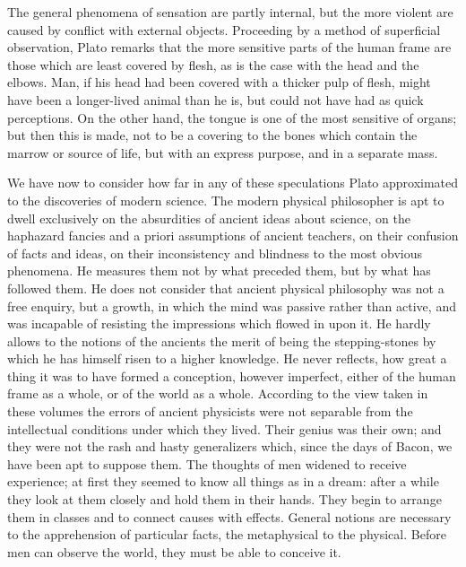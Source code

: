 The general phenomena of sensation are partly internal, but the more
violent are caused by conflict with external objects. Proceeding by a
method of superficial observation, Plato remarks that the more sensitive
parts of the human frame are those which are least covered by flesh, as is
the case with the head and the elbows. Man, if his head had been covered
with a thicker pulp of flesh, might have been a longer-lived animal than
he is, but could not have had as quick perceptions. On the other hand, the
tongue is one of the most sensitive of organs; but then this is made, not
to be a covering to the bones which contain the marrow or source of life,
but with an express purpose, and in a separate mass.


We have now to consider how far in any of these speculations Plato
approximated to the discoveries of modern science. The modern physical
philosopher is apt to dwell exclusively on the absurdities of ancient
ideas about science, on the haphazard fancies and a priori assumptions of
ancient teachers, on their confusion of facts and ideas, on their
inconsistency and blindness to the most obvious phenomena. He measures
them not by what preceded them, but by what has followed them. He does not
consider that ancient physical philosophy was not a free enquiry, but a
growth, in which the mind was passive rather than active, and was
incapable of resisting the impressions which flowed in upon it. He hardly
allows to the notions of the ancients the merit of being the
stepping-stones by which he has himself risen to a higher knowledge. He
never reflects, how great a thing it was to have formed a conception,
however imperfect, either of the human frame as a whole, or of the world
as a whole. According to the view taken in these volumes the errors of
ancient physicists were not separable from the intellectual conditions
under which they lived. Their genius was their own; and they were not the
rash and hasty generalizers which, since the days of Bacon, we have been
apt to suppose them. The thoughts of men widened to receive experience; at
first they seemed to know all things as in a dream: after a while they
look at them closely and hold them in their hands. They begin to arrange
them in classes and to connect causes with effects. General notions are
necessary to the apprehension of particular facts, the metaphysical to the
physical. Before men can observe the world, they must be able to conceive
it.

